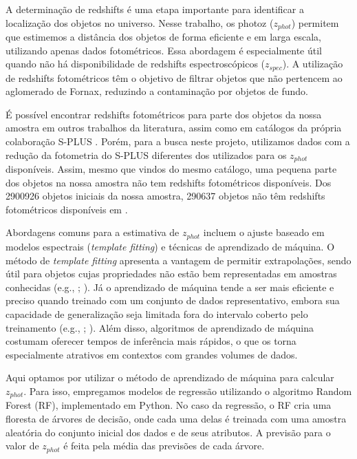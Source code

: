 A determinação de redshifts é uma etapa importante para identificar a localização dos objetos no universo. Nesse trabalho, os \ac{photoz} (\textit{$z_{phot}$}) permitem que estimemos a distância dos objetos de forma eficiente e em larga escala, utilizando apenas dados fotométricos. Essa abordagem é especialmente útil quando não há disponibilidade de redshifts espectroscópicos (\textit{$z_{spec}$}). A utilização de redshifts fotométricos têm o objetivo de filtrar objetos que não pertencem ao aglomerado de Fornax, reduzindo a contaminação por objetos de fundo.

É possível encontrar redshifts fotométricos para parte dos objetos da nossa amostra em outros trabalhos da literatura, assim como em catálogos da própria colaboração S-PLUS \citep{erik_photoz_2024}. Porém, para a busca neste projeto, utilizamos dados com a redução da fotometria do S-PLUS diferentes dos utilizados para os \textit{$z_{phot}$} disponíveis. Assim, mesmo que vindos do mesmo catálogo, uma pequena parte dos objetos na nossa amostra não tem redshifts fotométricos disponíveis. Dos 2900926 objetos iniciais da nossa amostra, 290637 objetos não têm redshifts fotométricos disponíveis em \citep{erik_photoz_2024}.

Abordagens comuns para a estimativa de \textit{$z_{phot}$} incluem o ajuste baseado em modelos espectrais (\textit{template fitting}) e técnicas de aprendizado de máquina. O método de \textit{template fitting} apresenta a vantagem de permitir extrapolações, sendo útil para objetos cujas propriedades não estão bem representadas em amostras conhecidas (e.g., \citealt{Bolzonella_2000}; \citealt{Gorecki_2014}). Já o aprendizado de máquina tende a ser mais eficiente e preciso quando treinado com um conjunto de dados representativo, embora sua capacidade de generalização seja limitada fora do intervalo coberto pelo treinamento (e.g., \citealt{Carrasco_2013}; \citealt{Sadeh_2016}). Além disso, algoritmos de aprendizado de máquina costumam oferecer tempos de inferência mais rápidos, o que os torna especialmente atrativos em contextos com grandes volumes de dados.


Aqui optamos por utilizar o método de aprendizado de máquina para calcular \textit{$z_{phot}$}. Para isso, empregamos modelos de regressão utilizando o algoritmo Random Forest (RF), implementado em Python. No caso da regressão, o RF cria uma floresta de árvores de decisão, onde cada uma delas é treinada com uma amostra aleatória do conjunto inicial dos dados e de seus atributos. A previsão para o valor de \textit{$z_{phot}$} é feita pela média das previsões de cada árvore.

